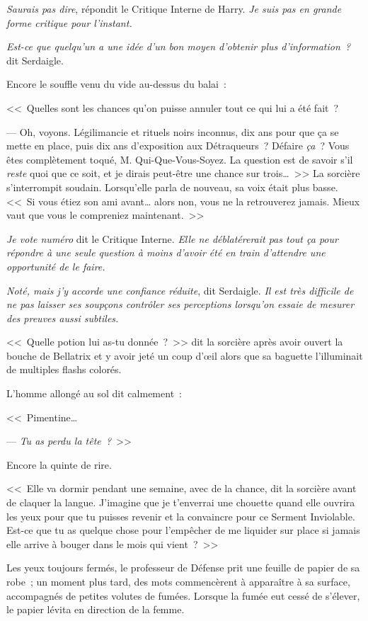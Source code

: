 \emph{Saurais pas dire}, répondit le Critique Interne de Harry. \emph{Je suis pas en grande forme critique pour l'instant.}

\emph{Est-ce que quelqu'un a une idée d'un bon moyen d'obtenir plus d'information~?} dit Serdaigle.

Encore le souffle venu du vide au-dessus du balai~:

<<~Quelles sont les chances qu'on puisse annuler tout ce qui lui a été fait~?

--- Oh, voyons. Légilimancie et rituels noirs inconnus, dix ans pour que ça se mette en place, puis dix ans d'exposition aux Détraqueurs~? Défaire \emph{ça}~? Vous êtes complètement toqué, M. Qui-Que-Vous-Soyez. La question est de savoir s'il \emph{reste} quoi que ce soit, et je dirais peut-être une chance sur trois…~>> La sorcière s'interrompit soudain. Lorsqu'elle parla de nouveau, sa voix était plus basse. <<~Si vous étiez son ami avant… alors non, vous ne la retrouverez jamais. Mieux vaut que vous le compreniez maintenant.~>>

\emph{Je vote numéro} dit le Critique Interne. \emph{Elle ne déblatérerait pas tout ça pour répondre à une seule question à moins d'avoir été en train d'attendre une opportunité de le faire.}

\emph{Noté, mais j'y accorde une confiance réduite}, dit Serdaigle. \emph{Il est très difficile de ne pas laisser ses soupçons contrôler ses perceptions lorsqu'on essaie de mesurer des preuves aussi subtiles.}

<<~Quelle potion lui as-tu donnée~?~>> dit la sorcière après avoir ouvert la bouche de Bellatrix et y avoir jeté un coup d'œil alors que sa baguette l'illuminait de multiples flashs colorés.

L'homme allongé au sol dit calmement~:

<<~Pimentine…

--- \emph{Tu as perdu la tête~?}~>>

Encore la quinte de rire.

<<~Elle va dormir pendant une semaine, avec de la chance, dit la sorcière avant de claquer la langue. J'imagine que je t'enverrai une chouette quand elle ouvrira les yeux pour que tu puisses revenir et la convaincre pour ce Serment Inviolable. Est-ce que tu as quelque chose pour l'empêcher de me liquider sur place si jamais elle arrive à bouger dans le mois qui vient~?~>>

Les yeux toujours fermés, le professeur de Défense prit une feuille de papier de sa robe~; un moment plus tard, des mots commencèrent à apparaître à sa surface, accompagnés de petites volutes de fumées. Lorsque la fumée eut cessé de s'élever, le papier lévita en direction de la femme.

